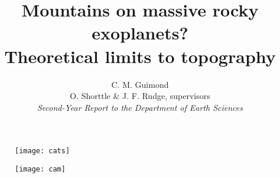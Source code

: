 \documentclass[10pt,a4paper]{article}
\author{C. M. Guimond \\ \normalsize O. Shorttle \& J. F. Rudge, supervisors \\ \textit{Second-Year Report to the Department of Earth Sciences}}
\title{Mountains on massive rocky exoplanets? \\ \large Theoretical limits to topography}
\begin{document}
\begin{figure}
    \centering
    \begin{minipage}{0.5\textwidth}
        \centering
        \texttt{[image: cats]} %
    \end{minipage}\hfill
    \begin{minipage}{0.5\textwidth}
        \centering
        \texttt{[image: cam]} %
    \end{minipage}
\end{figure}

\maketitle

\end{document}
